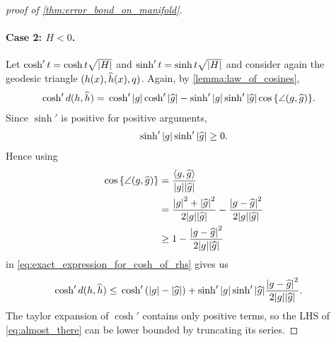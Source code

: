 \documentclass[english, a4paper, 12pt]{article}
\newcommand\bodgeip[2]{\langle #1, #2 \rangle} %
\begin{document}
\begin{proof}[proof of \cref{thm:error_bond_on_manifold}]
	\paragraph{Case 2: $H < 0$.}
	Let $\cosh'{t} = \cosh{t \sqrt{\abs{H}}}$ and $\sinh'{t} = \sinh{t \sqrt{\abs{H}}}$ and consider again the geodesic triangle $(h(x), \widehat{h}(x), q)$.
	Again, by \cref{lemma:law_of_cosines},
	\begin{align}
		\cosh'{d(h, \mathhat{h})} ={}&
		\cosh'{\abs{g}} \cosh'{\abs{\mathhat{g}}} - \sinh'{\abs{g}} \sinh'{\abs{\mathhat{g}}} \cos{\left\{ \angle(g, \mathhat{g}) \right\}}.%
		\label{eq:exact_expression_for_cosh_of_rhs}
	\end{align}
	Since $\sinh'{}$ is positive for positive arguments,
	\begin{align}
		\sinh'{\abs{g}} \sinh'{\abs{\widehat{g}}} \geq 0.
	\end{align}
	Hence using
	\begin{align}
		\cos{\left\{ \angle(g, \mathhat{g}) \right\}} ={}& \frac{\bodgeip{g}{\mathhat{g}}}{\abs{g} \abs{\mathhat{g}}}\\
		={}& \frac{\abs{g}^2 + \abs{\mathhat{g}}^2}{2 \abs{g} \abs{\mathhat{g}}} - \frac{\abs{g - \mathhat{g}}^2}{2 \abs{g} \abs{\mathhat{g}}}\\
		\geq{}& 1 - \frac{\abs{g - \mathhat{g}}^2}{2 \abs{g} \abs{\mathhat{g}}}
	\end{align}
	in \cref{eq:exact_expression_for_cosh_of_rhs} gives us
	\begin{align}
		\cosh'{d(h, \mathhat{h})} \leq{}& \cosh'{(\abs{g} - \abs{\mathhat{g}})} + \sinh'{\abs{g}} \sinh'{\abs{\mathhat{g}}} \frac{\abs{g - \mathhat{g}}^2}{2 \abs{g} \abs{\mathhat{g}}}.%
		\label{eq:almost_there}
	\end{align}
	The taylor expansion of $\cosh'{}$ contains only positive terms, so the LHS of \cref{eq:almost_there} can be lower bounded by truncating its series.

\end{proof}
\end{document}
